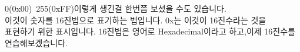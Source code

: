 \documentclass[preview]{standalone}
\begin{document}
\begin{center}
0(0x00)~255(0xFF)이렇게 생긴걸 한번쯤 보셨을 수도 있습니다.\\이것이 숫자를 16진법으로 표기하는 법입니다. 0x는 이것이 16진수라는 것을\\표현하기 위한 표시입니다. 16진법은 영어로 Hexadecimal이라고 하고,이제 16진수를 연습해보겠습니다.
\end{center}
\end{document}
